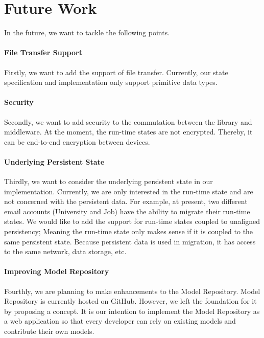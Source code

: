\newpage
\section {Future Work}
In the future, we want to tackle the following points. 
\paragraph{File Transfer Support}
Firstly, we want to add the support of file transfer. Currently, our state specification and implementation only support primitive data types.

\paragraph{Security}
Secondly, we want to add security to the commutation between the library and middleware. At the moment, the run-time states are not encrypted. Thereby, it can be end-to-end encryption between devices.

\paragraph{Underlying Persistent State}
Thirdly, we want to consider the underlying persistent state in our implementation. Currently, we are only interested in the run-time state and are not concerned with the persistent data.
For example, at present, two different email accounts (University and Job) have the ability to migrate their run-time states. We would like to add the support for run-time states coupled to unaligned persistency; Meaning the run-time state only makes sense if it is coupled to the same persistent state. Because persistent data is used in migration, it has access to the same network, data storage, etc.

\paragraph{Improving Model Repository}
Fourthly, we are planning to make enhancements to the Model Repository. Model Repository is currently hosted on GitHub. However, we left the foundation for it by proposing a concept. It is our intention to implement the Model Repository as a web application so that every developer can rely on existing models and contribute their own models.

